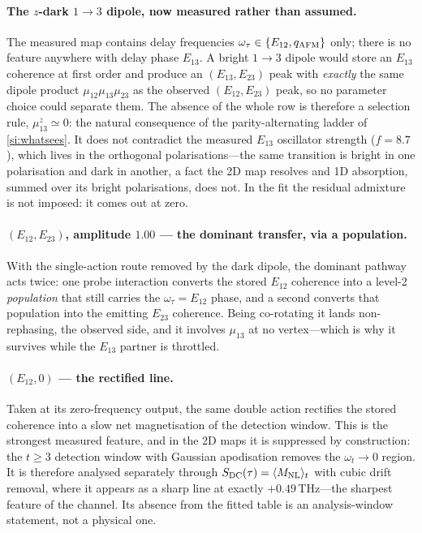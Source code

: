 \documentclass[11pt]{article}
\newcommand{\qafm}{q_{\rm AFM}}
\newcommand{\Mnl}{M_{\rm NL}}
\begin{document}
\paragraph{The $z$-dark $1\to3$ dipole, now measured rather than
assumed.}
The measured map contains delay frequencies
$\omega_\tau\in\{E_{12},\qafm\}$ only; there is no feature anywhere with
delay phase $E_{13}$.  A bright $1\!\to\!3$ dipole would store an
$E_{13}$ coherence at first order and produce an $(E_{13},E_{23})$ peak
with \emph{exactly} the same dipole product
$\mu_{12}\mu_{13}\mu_{23}$ as the observed $(E_{12},E_{23})$ peak, so no
parameter choice could separate them.  The absence of the whole row is
therefore a selection rule, $\mu^z_{13}\simeq0$: the natural consequence
of the parity-alternating ladder of \cref{si:whatsees}.  It does not
contradict the measured $E_{13}$ oscillator strength ($f=8.7$), which
lives in the orthogonal polarisations---the same transition is bright in
one polarisation and dark in another, a fact the 2D map resolves and 1D
absorption, summed over its bright polarisations, does not.  In the fit
the residual admixture is not imposed: it comes out at zero.

\paragraph{$(E_{12},E_{23})$, amplitude $1.00$ --- the dominant
transfer, via a population.}
With the single-action route removed by the dark dipole, the dominant
pathway acts twice: one probe interaction converts the stored $E_{12}$
coherence into a level-2 \emph{population} that still carries the
$\omega_\tau=E_{12}$ phase, and a second converts that population into
the emitting $E_{23}$ coherence.  Being co-rotating it lands
non-rephasing, the observed side, and it involves $\mu_{13}$ at no
vertex---which is why it survives while the $E_{13}$ partner is
throttled.

\paragraph{$(E_{12},0)$ --- the rectified line.}
Taken at its zero-frequency output, the same double action rectifies the
stored coherence into a slow net magnetisation of the detection window.
This is the strongest measured feature, and in the 2D maps it is
suppressed by construction: the $t\geq3$ detection window with Gaussian
apodisation removes the $\omega_t\to0$ region.  It is therefore analysed
separately through $S_{\rm DC}(\tau)=\langle\Mnl\rangle_t$ with cubic
drift removal, where it appears as a sharp line at exactly
$+0.49$\,THz---the sharpest feature of the channel.  Its absence from
the fitted table is an analysis-window statement, not a physical one.
\end{document}
